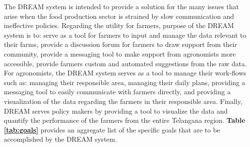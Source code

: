 The DREAM system is intended to provide a solution for the many issues that arise when the food production sector is strained by slow communication and ineffective policies. Regarding the utility for farmers, purpose of the DREAM system is to: serve as a tool for farmers to input and manage the data relevant to their farms, provide a discussion forum for farmers to draw support from their community, provide a messaging tool to make support from agronomists more accessible, provide farmers custom and automated suggestions from the raw data. For agronomists, the DREAM system serves as a tool to manage their work-flows such as: managing their responsible area, managing their daily plans, providing a messaging tool to easily communicate with farmers directly, and providing a visualization of the data regarding the farmers in their responsible area. Finally, DREAM serves policy makers by providing a tool to visualize the data and quantify the performance of the farmers from the entire Telangana region. \textbf{Table \ref{tab:goals}} provides an aggregate list of the specific goals that are to be accomplished by the DREAM system.


